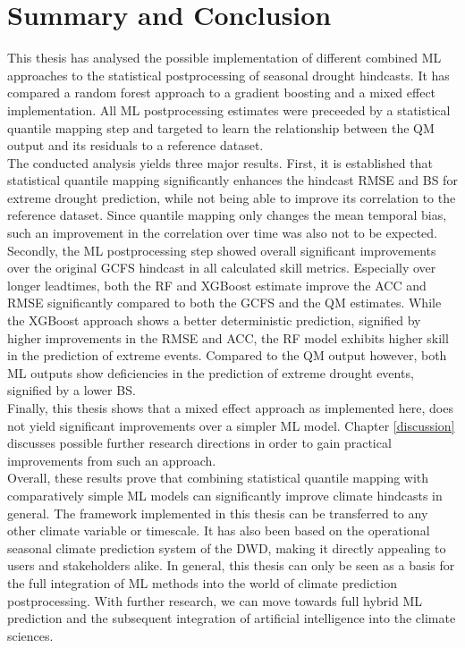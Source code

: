 \documentclass[ba-lentz.tex]{subfile}
\begin{document}
\section{Summary and Conclusion}\label{conclusion}

This thesis has analysed the possible implementation of different combined ML approaches to the statistical postprocessing of seasonal drought hindcasts.
It has compared a random forest approach to a gradient boosting and a mixed effect implementation.
All ML postprocessing estimates were preceeded by a statistical quantile mapping step and targeted to learn the relationship between the QM output and its residuals to a reference dataset. \\
The conducted analysis yields three major results.
First, it is established that statistical quantile mapping significantly enhances the hindcast RMSE and BS for extreme drought prediction, while not being able to improve its correlation to the reference dataset.
Since quantile mapping only changes the mean temporal bias, such an improvement in the correlation over time was also not to be expected. \\
Secondly, the ML postprocessing step showed overall significant improvements over the original GCFS hindcast in all calculated skill metrics.
Especially over longer leadtimes, both the RF and XGBoost estimate improve the ACC and RMSE significantly compared to both the GCFS and the QM estimates.
While the XGBoost approach shows a better deterministic prediction, signified by higher improvements in the RMSE and ACC, the RF model exhibits higher skill in the prediction of extreme events.
Compared to the QM output however, both ML outputs show deficiencies in the prediction of extreme drought events, signified by a lower BS.\\
Finally, this thesis shows that a mixed effect approach as implemented here, does not yield significant improvements over a simpler ML model.
Chapter \ref{discussion} discusses possible further research directions in order to gain practical improvements from such an approach. \\
Overall, these results prove that combining statistical quantile mapping with comparatively simple ML models can significantly improve climate hindcasts in general.
The framework implemented in this thesis can be transferred to any other climate variable or timescale.
It has also been based on the operational seasonal climate prediction system of the DWD, making it directly appealing to users and stakeholders alike.
In general, this thesis can only be seen as a basis for the full integration of ML methods into the world of climate prediction postprocessing.
With further research, we can move towards full hybrid ML prediction and the subsequent integration of artificial intelligence into the climate sciences.
\end{document}
